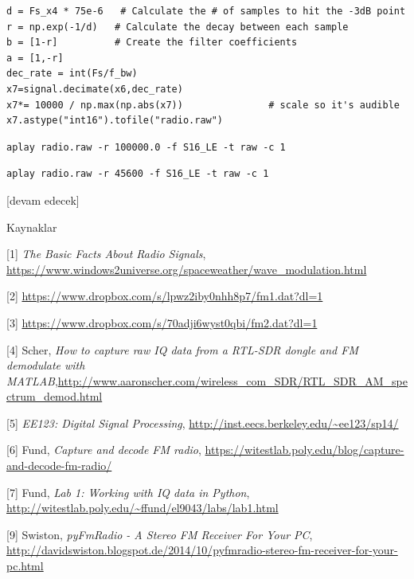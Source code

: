 \documentclass[12pt,fleqn]{article}\usepackage{../../common}
\begin{document}
\begin{verbatim}
d = Fs_x4 * 75e-6   # Calculate the # of samples to hit the -3dB point
r = np.exp(-1/d)   # Calculate the decay between each sample
b = [1-r]          # Create the filter coefficients
a = [1,-r]
dec_rate = int(Fs/f_bw)
x7=signal.decimate(x6,dec_rate)
x7*= 10000 / np.max(np.abs(x7))               # scale so it's audible
x7.astype("int16").tofile("radio.raw")
\end{verbatim}


\begin{verbatim}
aplay radio.raw -r 100000.0 -f S16_LE -t raw -c 1
\end{verbatim}

\begin{verbatim}
aplay radio.raw -r 45600 -f S16_LE -t raw -c 1
\end{verbatim}

[devam edecek]

Kaynaklar

[1] {\em The Basic Facts About Radio Signals}, \url{https://www.windows2universe.org/spaceweather/wave_modulation.html}

[2] \url{https://www.dropbox.com/s/lpwz2iby0nhh8p7/fm1.dat?dl=1}

[3] \url{https://www.dropbox.com/s/70adji6wyst0qbi/fm2.dat?dl=1}

[4] Scher, {\em How to capture raw IQ data from a RTL-SDR dongle and FM demodulate with MATLAB},\url{http://www.aaronscher.com/wireless_com_SDR/RTL_SDR_AM_spectrum_demod.html}

[5] {\em EE123: Digital Signal Processing}, \url{http://inst.eecs.berkeley.edu/~ee123/sp14/}

[6] Fund, {\em Capture and decode FM radio}, \url{https://witestlab.poly.edu/blog/capture-and-decode-fm-radio/}

[7] Fund, {\em Lab 1: Working with IQ data in Python}, \url{http://witestlab.poly.edu/~ffund/el9043/labs/lab1.html}

[9] Swiston, {\em pyFmRadio - A Stereo FM Receiver For Your PC}, \url{http://davidswiston.blogspot.de/2014/10/pyfmradio-stereo-fm-receiver-for-your-pc.html}
\end{document}
